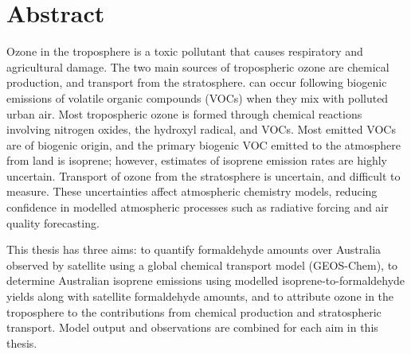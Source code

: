 

\chapter*{Abstract}
\setcounter{page}{5}


% 

%
Ozone in the troposphere is a toxic pollutant that causes respiratory and agricultural damage. 
The two main sources of tropospheric ozone are chemical production, and transport from the stratosphere.
can occur following biogenic emissions of volatile organic compounds (VOCs) when they mix with polluted urban air.
Most tropospheric ozone is formed through chemical reactions involving nitrogen oxides, the hydroxyl radical, and VOCs.
Most emitted VOCs are of biogenic origin, and the primary biogenic VOC emitted to the atmosphere from land is isoprene; however, estimates of isoprene emission rates are highly uncertain.
Transport of ozone from the stratosphere is uncertain, and difficult to measure.
These uncertainties affect atmospheric chemistry models, reducing confidence in modelled atmospheric processes such as radiative forcing and air quality forecasting. 

This thesis has three aims: to quantify formaldehyde amounts over Australia observed by satellite using a global chemical transport model (GEOS-Chem), to determine Australian isoprene emissions using modelled isoprene-to-formaldehyde yields along with satellite formaldehyde amounts, and to attribute ozone in the troposphere to the contributions from chemical production and stratospheric transport. 
Model output and observations are combined for each aim in this thesis.


